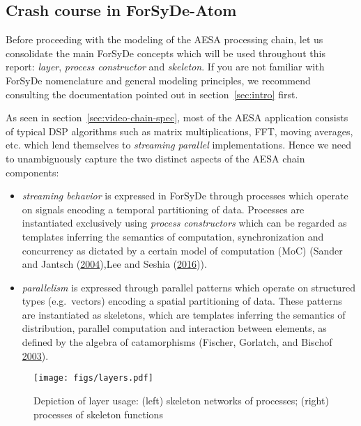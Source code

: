 \documentclass[
  a4paper,
]{article}
\begin{document}
\hypertarget{sec:crash-atom}{%
\subsection{Crash course in ForSyDe-Atom}\label{sec:crash-atom}}

Before proceeding with the modeling of the AESA processing chain, let us
consolidate the main ForSyDe concepts which will be used throughout this
report: \emph{layer}, \emph{process constructor} and \emph{skeleton}. If
you are not familiar with ForSyDe nomenclature and general modeling
principles, we recommend consulting the documentation pointed out in
section~\ref{sec:intro} first.

As seen in section~\ref{sec:video-chain-spec}, most of the AESA
application consists of typical DSP algorithms such as matrix
multiplications, FFT, moving averages, etc. which lend themselves to
\emph{streaming parallel} implementations. Hence we need to
unambiguously capture the two distinct aspects of the AESA chain
components:

\begin{itemize}
\item
  \emph{streaming behavior} is expressed in ForSyDe through processes
  which operate on signals encoding a temporal partitioning of data.
  Processes are instantiated exclusively using \emph{process
  constructors} which can be regarded as templates inferring the
  semantics of computation, synchronization and concurrency as dictated
  by a certain model of computation (MoC) (Sander and Jantsch
  (\protect\hyperlink{ref-sander-2004}{2004}),Lee and Seshia
  (\protect\hyperlink{ref-leeseshia-15}{2016})).
\item
  \emph{parallelism} is expressed through parallel patterns which
  operate on structured types (e.g.~vectors) encoding a spatial
  partitioning of data. These patterns are instantiated as skeletons,
  which are templates inferring the semantics of distribution, parallel
  computation and interaction between elements, as defined by the
  algebra of catamorphisms (Fischer, Gorlatch, and Bischof
  \protect\hyperlink{ref-Fischer-2003}{2003}).
\end{itemize}

\begin{figure}
\hypertarget{fig:atom-layers}{%
\centering
\texttt{[image: figs/layers.pdf]}
\caption{Depiction of layer usage: (left) skeleton networks of
processes; (right) processes of skeleton
functions}\label{fig:atom-layers}
}
\end{figure}
\end{document}
